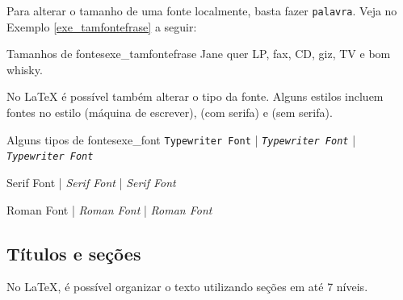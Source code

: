 Para alterar o tamanho de uma fonte localmente, basta fazer \texttt{{\large palavra}}. Veja no Exemplo \ref{exe_tamfontefrase} a seguir:

\begin{texexptitled}[breakable,center lower,enhanced,middle=2mm]{Tamanhos de fontes}{exe_tamfontefrase}
{\Huge Jane} {\huge quer} {\LARGE LP}, {\Large fax}, {\large CD}, 
{\normalsize giz}, {\small TV} {\footenotesize e} {\scriptsize bom} 
{\tiny whisky}.
\end{texexptitled}

No \LaTeX{} é possível também alterar o tipo da fonte. Alguns estilos incluem fontes no estilo \texttt{\texttt{}} (máquina de escrever), \texttt{\textsf{}} (com serifa) e \texttt{\textrm{}} (sem serifa).

\begin{texexptitled}[breakable,center lower,enhanced,middle=2mm]{Alguns tipos de fontes}{exe_font}
\texttt{Typewriter Font} | 
\texttt{\textit{Typewriter Font}} | 
\texttt{\textsl{Typewriter Font}}

\textsf{Serif Font} | 
\textsf{\textit{Serif Font}} | 
\textsf{\textsl{Serif Font}}

\textrm{Roman Font} | 
\textrm{\textit{Roman Font}} | 
\textrm{\textsl{Roman Font}}
\end{texexptitled}

\subsection{Títulos e seções}
\label{sec:tit_secs}

No \LaTeX{}, é possível organizar o texto utilizando seções em até 7 níveis.

